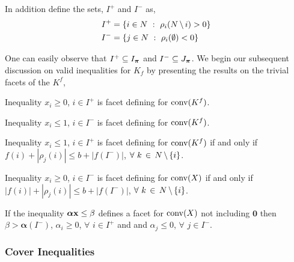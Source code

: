 \documentclass[10pt,twoside]{amsart}
\begin{document}
In addition define the sets, $I^+$ and $I^-$ as,
\begin{align*}
  I^{+} &= \left\{ {i\in N} \ : \ {\rho_i(N\,\backslash\, i) > 0} \right\}\\
  I^{-} &= \left\{ {j\in N} \ : \ {\rho_i(\emptyset) < 0} \right\}
\end{align*}

One can easily observe that $I^{+} \subseteq I_{\boldsymbol\pi}$ and $I^{-} \subseteq J_{\boldsymbol\pi}$. We begin our subsequent discussion on valid inequalities for $K_f$ by presenting the results on the trivial facets of the $K^f$,

\begin{prop}
  Inequality $x_i \geq 0$, $i\in I^+$ is facet defining for $\operatorname{conv}(K^f)$.
\end{prop}

\begin{prop}
  Inequality $x_i \leq 1$, $i\in I^-$ is facet defining for $\operatorname{conv}(K^f)$.
\end{prop}

\begin{prop}
  Inequality $x_i \leq 1$, $i\in I^+$ is facet defining for $\operatorname{conv}(K^f)$ if and only if $f(i) + |\rho_{j}(i)| \leq b + |f(I^-)| $, $\forall\,\,k\,\in\, N\,\backslash\,\{i\}$.
\end{prop}

\begin{prop}
  Inequality $x_i \geq 0$, $i\in I^-$ is facet defining for $\operatorname{conv}(X)$ if and only if $|f(i)| + |\rho_{j}(i)| \leq b + |f(I^-)| $, $\forall\,\,k\,\in\, N\,\backslash\,\{i\}$.
\end{prop}


\begin{prop}
  If the inequality $\boldsymbol\alpha\mathbf{x} \leq \beta$ defines a facet for $\operatorname{conv}(X)$ not including $\mathbf{0}$ then $\beta > \boldsymbol\alpha(I^-)$, $\alpha_i \geq 0$, $\forall\,\,i\in I^+$ and and $\alpha_j \leq 0$, $\forall\,\,j\in I^-$.
\end{prop}

\subsubsection{Cover Inequalities}
\label{sec:submodcover}
\hfill
\end{document}
